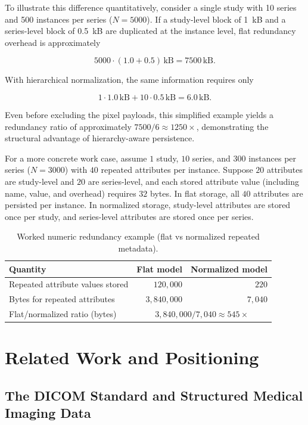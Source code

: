 To illustrate this difference quantitatively, consider a single study with 10 series and 500 instances per series (\(N=5000\)). If a study-level block of 1~kB and a series-level block of 0.5~kB are duplicated at the instance level, flat redundancy overhead is approximately

\[
5000 \cdot (1.0 + 0.5)\,\text{kB} = 7500\,\text{kB}.
\]

With hierarchical normalization, the same information requires only

\[
1 \cdot 1.0\,\text{kB} + 10 \cdot 0.5\,\text{kB} = 6.0\,\text{kB}.
\]

Even before excluding the pixel payloads, this simplified example yields a redundancy ratio of approximately \(7500 / 6 \approx 1250\times\), demonstrating the structural advantage of hierarchy-aware persistence.

For a more concrete work case, assume \(1\) study, \(10\) series, and \(300\) instances per series (\(N=3000\)) with \(40\) repeated attributes per instance. Suppose \(20\) attributes are study-level and \(20\) are series-level, and each stored attribute value (including name, value, and overhead) requires \(32\) bytes. In flat storage, all \(40\) attributes are persisted per instance. In normalized storage, study-level attributes are stored once per study, and series-level attributes are stored once per series.

\begin{table}[htbp]
\centering
\caption{Worked numeric redundancy example (flat vs normalized repeated metadata).}
\label{tab:worked-normalization}
\begin{tabular}{lrr}
\toprule
Quantity & Flat model & Normalized model \\
\midrule
Repeated attribute values stored & \(120{,}000\) & \(220\) \\
Bytes for repeated attributes & \(3{,}840{,}000\) & \(7{,}040\) \\
Flat/normalized ratio (bytes) & \multicolumn{2}{c}{\(3{,}840{,}000 / 7{,}040 \approx 545\times\)} \\
\bottomrule
\end{tabular}
\end{table}

\section{Related Work and Positioning}
\subsection{The DICOM Standard and Structured Medical Imaging Data}


